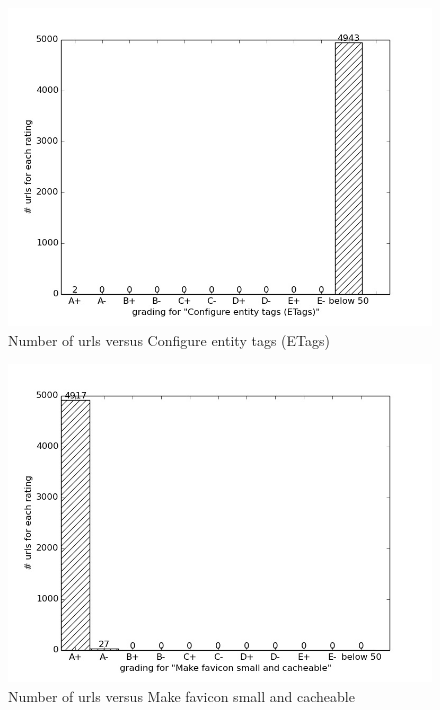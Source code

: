 \documentclass[conference]{IEEEtran}
\begin{document}
\begin{figure}[ht]
 \centering
  \includegraphics[scale=0.33]{new-img-jpg/vlab-jpg/Configure entity tags (ETags).jpg}
\caption{Number of urls versus Configure entity tags (ETags)}	
\label{fig:configure-et}
\end{figure}

\begin{figure}[ht]
 \centering
  \includegraphics[scale=0.33]{new-img-jpg/vlab-jpg/Make favicon small and cacheable.jpg}
\caption{Number of urls versus Make favicon small and cacheable}	
\label{fig:favicon}
\end{figure}
\end{document}
